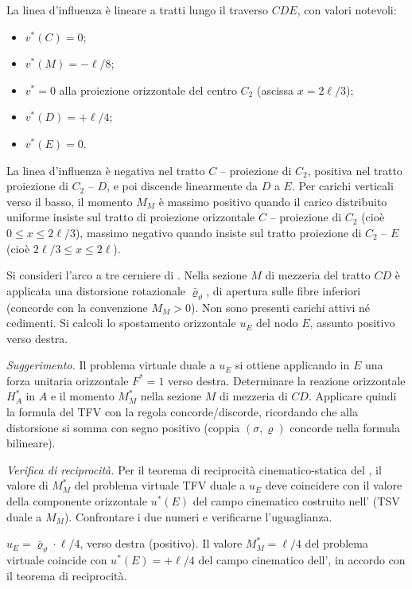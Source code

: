 \begin{esercizio}
	\risultato La linea d'influenza è lineare a tratti lungo il
	traverso $CDE$, con valori notevoli:
	\begin{itemize}[noitemsep,topsep=2pt]
		\item $v^{*}(C) = 0$;
		\item $v^{*}(M) = -\ell/8$;
		\item $v^{*} = 0$ alla proiezione orizzontale del centro $C_2$
		(ascissa $x = 2\ell/3$);
		\item $v^{*}(D) = +\ell/4$;
		\item $v^{*}(E) = 0$.
	\end{itemize}
	La linea d'influenza è negativa nel tratto $C$ -- proiezione di
	$C_2$, positiva nel tratto proiezione di $C_2$ -- $D$, e poi
	discende linearmente da $D$ a $E$. Per carichi verticali verso
	il basso, il momento $M_M$ è massimo positivo quando il carico
	distribuito uniforme insiste sul tratto di proiezione orizzontale
	$C$ -- proiezione di $C_2$ (cioè $0 \le x \le 2\ell/3$), massimo
	negativo quando insiste sul tratto proiezione di $C_2$ -- $E$
	(cioè $2\ell/3 \le x \le 2\ell$).
	
\end{esercizio}

\begin{esercizio}
	\label{ex:TFV_uE_arco}
	
	Si consideri l'arco a tre cerniere di
	. Nella sezione $M$ di mezzeria del
	tratto $CD$ è applicata una distorsione rotazionale 
	$\bar\varrho_\vartheta$, di apertura sulle fibre inferiori
	(concorde con la convenzione $M_M > 0$). Non sono presenti
	carichi attivi né cedimenti. Si calcoli lo spostamento
	orizzontale $u_E$ del nodo $E$, assunto positivo verso destra.
	
	\textit{Suggerimento.} Il problema virtuale duale a $u_E$ si
	ottiene applicando in $E$ una forza unitaria orizzontale
	$F^* = 1$ verso destra. Determinare la reazione orizzontale
	$H_A^*$ in $A$ e il momento $M_M^*$ nella sezione $M$ di
	mezzeria di $CD$. Applicare quindi la formula del TFV con la
	regola concorde/discorde, ricordando che alla distorsione si
	somma con segno positivo (coppia $(\sigma,\varrho)$ concorde
	nella formula bilineare).
	
	\textit{Verifica di reciprocità.} Per il teorema di
	reciprocità cinematico-statica del 
	, il valore di $M_M^*$ del problema
	virtuale TFV duale a $u_E$ deve coincidere con il valore della
	componente orizzontale $u^{*}(E)$ del campo cinematico
	costruito nell' (TSV duale a $M_M$).
	Confrontare i due numeri e verificarne l'uguaglianza.
	
	\risultato $u_E = \bar\varrho_\vartheta \cdot \ell/4$, verso
	destra (positivo). Il valore $M_M^* = \ell/4$ del problema
	virtuale coincide con $u^{*}(E) = +\ell/4$ del campo
	cinematico dell', in accordo con il
	teorema di reciprocità.
	
	
\end{esercizio}

